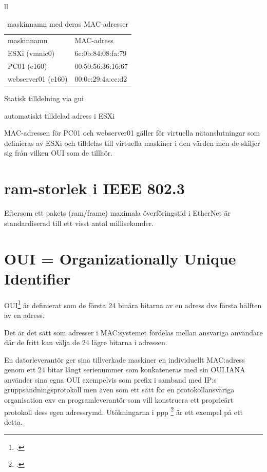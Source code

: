 \documentclass[swedish,10pt,a4paper]{report}
\begin{document}
\begin{table}
  \centering
  \begin{threeparttable}{ll}
    \caption{maskinnamn med deras MAC-adresser}
    \begin{tabular}{ss} %
      maskinnamn         & MAC-adress       \\
      ESXi (vmnic0)      & 6c:0b:84:08:fa:79\\
      PC01 (e160)        & 00:50:56:36:16:67\\ %
      webserver01 (e160) & 00:0c:29:4a:cc:d2\\ %
    \end{tabular}
    \begin{tablenotes}
    \item[1] {Statisk tilldelning via gui}
    \item[2] {automatiskt tilldelad adress i ESXi}
    \end{tablenotes}
  \end{threeparttable}
\end{table}

MAC-adressen för PC01 och webserver01 gäller för virtuella nätanslutningar som
definieras av ESXi och tilldelas till virtuella maskiner i den värden
men de skiljer sig från vilken OUI som de tillhör.

\chapter{ram-storlek i IEEE 802.3}\label{chap:frame_length}

Eftersom ett pakets (ram/frame) maximala överföringstid i EtherNet är standardiserad
till ett visst antal millisekunder.

\chapter{OUI = Organizationally Unique Identifier}\label{subsubsec:oui}

OUI\footcite{rfc5342} är definierat som de första 24 binära bitarna av en adress dvs första
hälften av en adress.

Det är det sätt som adresser i MAC:systemet fördelas mellan ansvariga användare
där de fritt kan välja de 24 lägre bitarna i adressen.

En datorleverantör ger sina tillverkade maskiner en individuellt MAC:adress genom
ett 24 bitar långt serienummer som konkateneras med sin OUI.\@ IANA använder
sina egna OUI exempelvis som prefix i samband med IP:s gruppsändningsprotokoll men även
som ett sätt för en protokollansvariga organisation exv en programleverantör
som vill konstruera ett proprieärt protokoll dess egen adressrymd. Utökningarna i
ppp \footcite{rfc2153} är ett exempel på ett detta.
\end{document}

